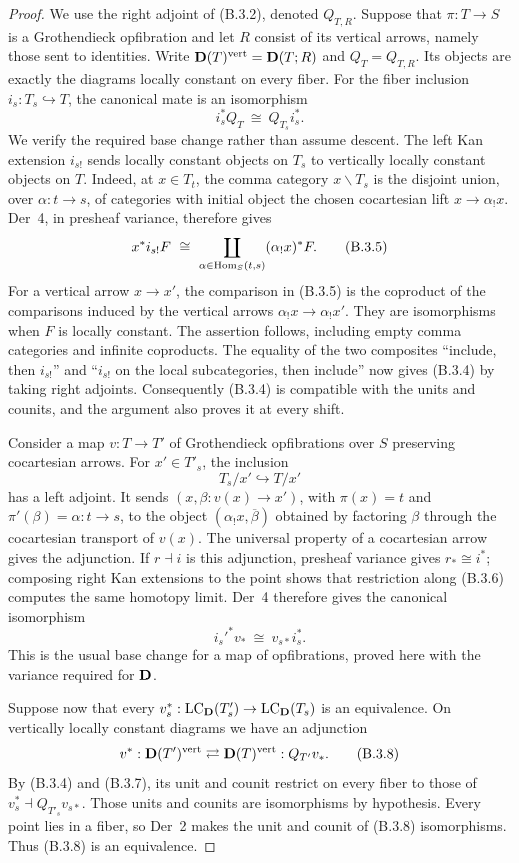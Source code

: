 \begin{proof}
We use the right adjoint of (B.3.2), denoted $Q_{T,R}$. Suppose that
$\pi:T\to S$ is a Grothendieck opfibration and let $R$ consist of
its vertical arrows, namely those sent to identities. Write
$\mathbf D(T)^{\mathrm{vert}}=\mathbf D(T;R)$ and $Q_T=Q_{T,R}$. Its objects
are exactly the diagrams locally constant on every fiber. For the
fiber inclusion $i_s:T_s\hookrightarrow T$, the canonical mate is
an isomorphism
\[
 i_s^*Q_T\ \cong\ Q_{T_s}i_s^*.
 \tag{B.3.4}
\]
We verify the required base change rather than assume descent.
The left Kan extension $i_{s!}$ sends locally constant objects on
$T_s$ to vertically locally constant objects on $T$. Indeed, at
$x\in T_t$, the comma category $x\backslash T_s$ is the disjoint
union, over $\alpha:t\to s$, of categories with initial object
the chosen cocartesian lift $x\to\alpha_!x$. Der~4, in presheaf
variance, therefore gives
\[
 x^*i_{s!}F\ \cong\
 \coprod_{\alpha\in\operatorname{Hom}_S(t,s)}(\alpha_!x)^*F.
 \tag{B.3.5}
\]
For a vertical arrow $x\to x'$, the comparison in (B.3.5) is the
coproduct of the comparisons induced by the vertical arrows
$\alpha_!x\to\alpha_!x'$. They are isomorphisms when $F$ is
locally constant. The assertion follows, including empty comma
categories and infinite coproducts. The equality of the two
composites ``include, then $i_{s!}$'' and ``$i_{s!}$ on the local
subcategories, then include'' now gives (B.3.4) by taking right
adjoints. Consequently (B.3.4) is compatible with the units and
counits, and the argument also proves it at every shift.

Consider a map $v:T\to T'$ of Grothendieck opfibrations over $S$
preserving cocartesian arrows. For $x'\in T'_s$, the inclusion
\[
 T_s/x'\hookrightarrow T/x'
 \tag{B.3.6}
\]
has a left adjoint. It sends $(x,\beta:v(x)\to x')$, with
$\pi(x)=t$ and $\pi'(\beta)=\alpha:t\to s$, to the object
$(\alpha_!x,\overline\beta)$ obtained by factoring $\beta$
through the cocartesian transport of $v(x)$. The universal property
of a cocartesian arrow gives the adjunction. If $r\dashv i$ is
this adjunction, presheaf variance gives $r_*\cong i^*$; composing
right Kan extensions to the point shows that restriction along
(B.3.6) computes the same homotopy limit. Der~4 therefore gives the
canonical isomorphism
\[
 i_s'^*v_*\ \cong\ v_{s*}i_s^*.
 \tag{B.3.7}
\]
This is the usual base change for a map of opfibrations, proved here
with the variance required for $\mathbf D$.

Suppose now that every $v_s^*:\operatorname{LC}_\mathbf D(T'_s)\to\operatorname{LC}_\mathbf D(T_s)$
is an equivalence. On vertically locally constant diagrams we have
an adjunction
\[
 v^*:\mathbf D(T')^{\mathrm{vert}}
 \rightleftarrows\mathbf D(T)^{\mathrm{vert}}:Q_{T'}v_*.
 \tag{B.3.8}
\]
By (B.3.4) and (B.3.7), its unit and counit restrict on every fiber
to those of
$v_s^*\dashv Q_{T'_s}v_{s*}$. Those units and counits are
isomorphisms by hypothesis. Every point lies in a fiber, so Der~2
makes the unit and counit of (B.3.8) isomorphisms. Thus (B.3.8) is
an equivalence.


\end{proof}
